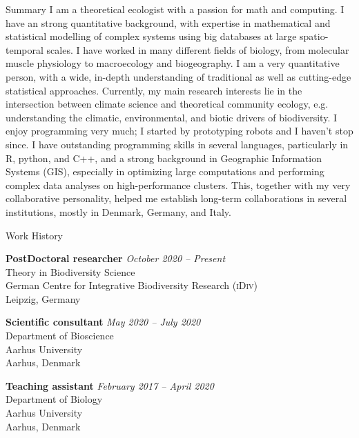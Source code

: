 \documentclass{resume} %
\begin{document}
\begin{rSection}{Summary}
I am a theoretical ecologist with a passion for math and computing.
I have an strong quantitative background, with expertise in mathematical and statistical modelling of complex systems using big databases at large spatio-temporal scales.
I have worked in many different fields of biology, from molecular muscle physiology to macroecology and biogeography.
I am a very quantitative person, with a wide, in-depth understanding of traditional as well as cutting-edge statistical approaches.
Currently, my main research interests lie in the intersection between climate science and theoretical community ecology, e.g. understanding the climatic, environmental, and biotic drivers of biodiversity.
I enjoy programming very much; I started by prototyping robots and I haven't stop since.
I have outstanding programming skills in several languages, particularly in R, python, and C++, and a strong background in Geographic Information Systems (GIS), especially in optimizing large computations and performing complex data analyses on high-performance clusters.
This, together with my very collaborative personality, helped me establish long-term collaborations in several institutions, mostly in Denmark, Germany, and Italy.

\end{rSection}

\begin{rSection}{Work History}

{\bf PostDoctoral researcher} \hfill {\em October 2020 -- Present}\\
Theory in Biodiversity Science\\
German Centre for Integrative Biodiversity Research (\textsc{iDiv})\\
Leipzig, Germany

{\bf Scientific consultant} \hfill {\em May 2020 -- July 2020}\\
Department of Bioscience\\
Aarhus University\\
Aarhus, Denmark

{\bf Teaching assistant} \hfill {\em February 2017 -- April 2020}
\\Department of Biology\\
Aarhus University\\
Aarhus, Denmark

\end{rSection}
\end{document}
